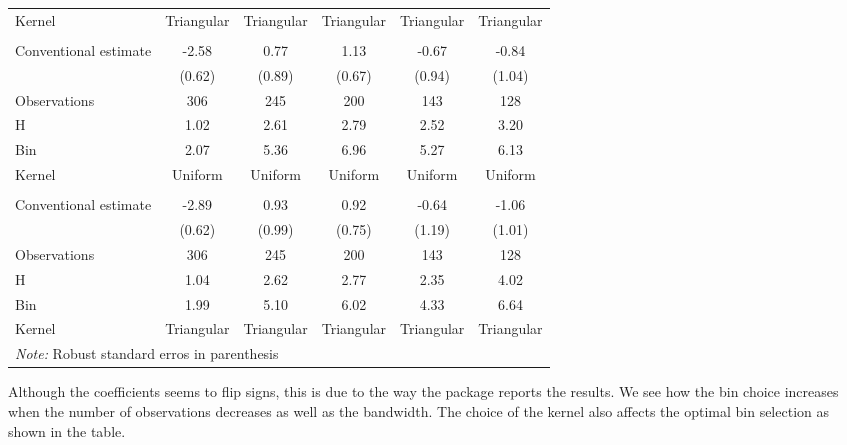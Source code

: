 \documentclass[
  12pt,
]{article}
\begin{document}
\begin{enumerate}
\begin{table}
\begin{tabular}[t]{lccccc}
  \hspace{1em}Kernel & Triangular & Triangular & Triangular & Triangular & \vphantom{1} Triangular\\
  \addlinespace[0.3em]
  \multicolumn{6}{l}{\textit{Panel B. Quadratic Polinomial}}\\
  \hspace{1em}Conventional estimate & -2.58 & 0.77 & 1.13 & -0.67 & -0.84\\
  \hspace{1em} & (0.62) & (0.89) & (0.67) & (0.94) & (1.04)\\
  \hspace{1em}Observations & 306 & 245 & 200 & 143 & \vphantom{1} 128\\
  \hspace{1em}H & 1.02 & 2.61 & 2.79 & 2.52 & 3.20\\
  \hspace{1em}Bin & 2.07 & 5.36 & 6.96 & 5.27 & 6.13\\
  \hspace{1em}Kernel & Uniform & Uniform & Uniform & Uniform & Uniform\\
  \\
  \hspace{1em}Conventional estimate & -2.89 & 0.93 & 0.92 & -0.64 & -1.06\\
  \hspace{1em} & (0.62) & (0.99) & (0.75) & (1.19) & (1.01)\\
  \hspace{1em}Observations & 306 & 245 & 200 & 143 & 128\\
  \hspace{1em}H & 1.04 & 2.62 & 2.77 & 2.35 & 4.02\\
  \hspace{1em}Bin & 1.99 & 5.10 & 6.02 & 4.33 & 6.64\\
  \hspace{1em}Kernel & Triangular & Triangular & Triangular & Triangular & Triangular\\
  \bottomrule
  \bottomrule
  \multicolumn{6}{l}{\textit{Note:} Robust standard erros in parenthesis}\\
  \end{tabular}
  \end{table}
\end{enumerate}

Although the coefficients seems to flip signs, this is due to the way
the package reports the results. We see how the bin choice increases
when the number of observations decreases as well as the bandwidth. The
choice of the kernel also affects the optimal bin selection as shown in
the table.
\end{document}
